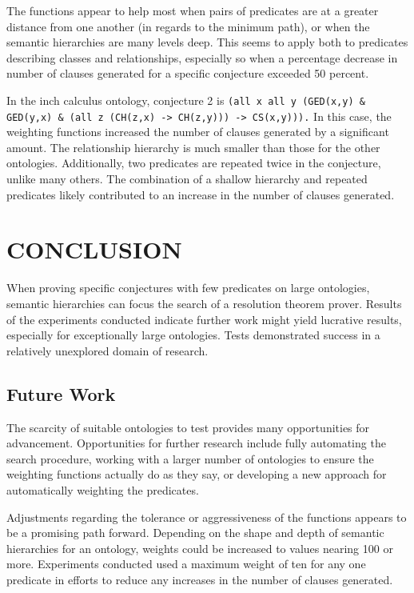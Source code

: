 \documentclass{article}
\begin{document}
The functions appear to help most when pairs of predicates are at a greater distance from one another (in regards to the minimum path), or when the semantic hierarchies are many levels deep. This seems to apply both to predicates describing classes and relationships, especially so when a percentage decrease in number of clauses generated for a specific conjecture exceeded 50 percent. 

In the inch calculus ontology, conjecture 2 is \texttt{(all x all y (GED(x,y) \& GED(y,x) \& (all z (CH(z,x) -> CH(z,y))) -> CS(x,y))).} In this case, the weighting functions increased the number of clauses generated by a significant amount. The relationship hierarchy is much smaller than those for the other ontologies. Additionally, two predicates are repeated twice in the conjecture, unlike many others. The combination of a shallow hierarchy and repeated predicates likely contributed to an increase in the number of clauses generated. 

\newpage
\vspace*{.05in}
\section{\MakeUppercase{Conclusion}}

When proving specific conjectures with few predicates on large ontologies, semantic hierarchies can focus the search of a resolution theorem prover. Results of the experiments conducted indicate further work might yield lucrative results, especially for exceptionally large ontologies. Tests demonstrated success in a relatively unexplored domain of research. 

\subsection{Future Work}
The scarcity of suitable ontologies to test provides many opportunities for advancement. Opportunities for further research include fully automating the search procedure, working with a larger number of ontologies to ensure the weighting functions actually do as they say, or developing a new approach for  automatically weighting the predicates. 

Adjustments regarding the tolerance or aggressiveness of the functions appears to be a promising path forward. Depending on the shape and depth of semantic hierarchies for an ontology, weights could be increased to values nearing 100 or more. Experiments conducted used a maximum weight of ten for any one predicate in efforts to reduce any increases in the number of clauses generated. 
\end{document}
